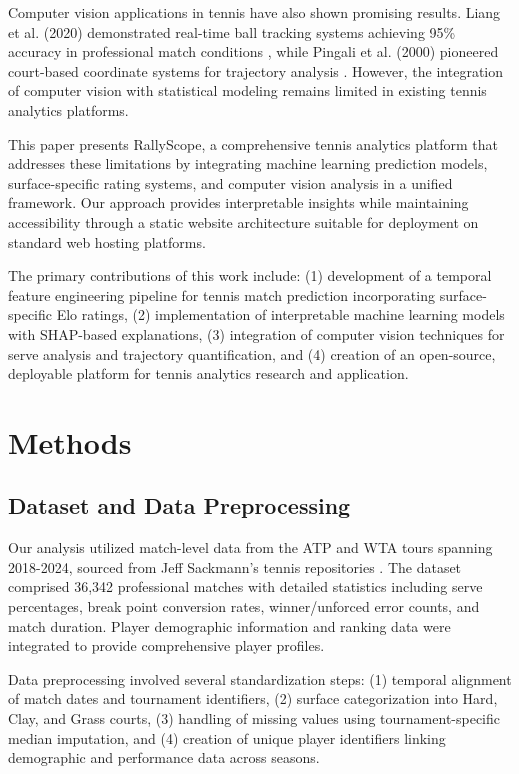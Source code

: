 \documentclass[11pt,a4paper]{article}
\begin{document}
Computer vision applications in tennis have also shown promising results. Liang et al. (2020) demonstrated real-time ball tracking systems achieving 95\% accuracy in professional match conditions \citep{liang2020scheme}, while Pingali et al. (2000) pioneered court-based coordinate systems for trajectory analysis \citep{pingali2000real}. However, the integration of computer vision with statistical modeling remains limited in existing tennis analytics platforms.

This paper presents RallyScope, a comprehensive tennis analytics platform that addresses these limitations by integrating machine learning prediction models, surface-specific rating systems, and computer vision analysis in a unified framework. Our approach provides interpretable insights while maintaining accessibility through a static website architecture suitable for deployment on standard web hosting platforms.

The primary contributions of this work include: (1) development of a temporal feature engineering pipeline for tennis match prediction incorporating surface-specific Elo ratings, (2) implementation of interpretable machine learning models with SHAP-based explanations, (3) integration of computer vision techniques for serve analysis and trajectory quantification, and (4) creation of an open-source, deployable platform for tennis analytics research and application.

\section{Methods}

\subsection{Dataset and Data Preprocessing}

Our analysis utilized match-level data from the ATP and WTA tours spanning 2018-2024, sourced from Jeff Sackmann's tennis repositories \citep{sackmann2024tennis}. The dataset comprised 36,342 professional matches with detailed statistics including serve percentages, break point conversion rates, winner/unforced error counts, and match duration. Player demographic information and ranking data were integrated to provide comprehensive player profiles.

Data preprocessing involved several standardization steps: (1) temporal alignment of match dates and tournament identifiers, (2) surface categorization into Hard, Clay, and Grass courts, (3) handling of missing values using tournament-specific median imputation, and (4) creation of unique player identifiers linking demographic and performance data across seasons.
\end{document}
